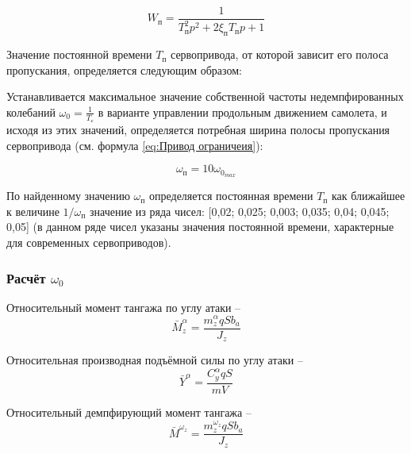    \begin{equation}
    \label{eq:Привод ограничеия}
        W_{\text{п}}=\frac{1}{T_\text{п}^2p^2+2\xi_\text{п}T_\text{п}p+1}
    \end{equation}
    
    Значение постоянной времени  $T_\text{п}$ сервопривода, от которой зависит его полоса пропускания, определяется следующим образом:
    
    Устанавливается максимальное значение собственной частоты  недемпфированных колебаний $\omega_0=\frac{1}{T_{\text{с}}}$ в варианте управлении продольным движением самолета, и исходя из этих значений, определяется потребная ширина полосы пропускания сервопривода (см. формула \ref{eq:Привод ограничеия}):
    
    \begin{equation}
        \label{eq:Собственная частота привода}
        \omega_\text{п}=10 \omega_{0_{max}}
    \end{equation}
    
    По найденному значению $\omega_\text{п}$ определяется постоянная времени  $T_\text{п}$ как ближайшее к величине $1/ \omega_\text{п}$  значение из ряда чисел: [0,02; 0,025; 0,003; 0,035; 0,04; 0,045; 0,05] (в данном ряде чисел указаны значения постоянной времени, характерные для современных сервоприводов).
    
    \subsubsection{Расчёт $\omega_0$}
    
    Относительный момент тангажа по углу атаки -- 
    \begin{equation}
        \label{eq:Относительный момент тангажа по углу атаки}
        \bar{M}_z^{\alpha} = \frac{m_z^{\alpha}qSb_a}{J_z}
    \end{equation}
    
    Относительная производная подъёмной силы по углу атаки --
    \begin{equation}
        \label{eq:Относительный момент тангажа по угловой скорости тангажа}
        \bar{Y}^\alpha=\frac{C_y^\alpha qS}{mV}
    \end{equation}
    
    Относительный демпфирующий момент тангажа --
    \begin{equation}
        \label{eq:Относительный демпфирующий момент тангажа}
        \bar{M}^{\omega_z}=\frac{m_z^{\omega_z} qS b_a}{J_z}
    \end{equation}
    
